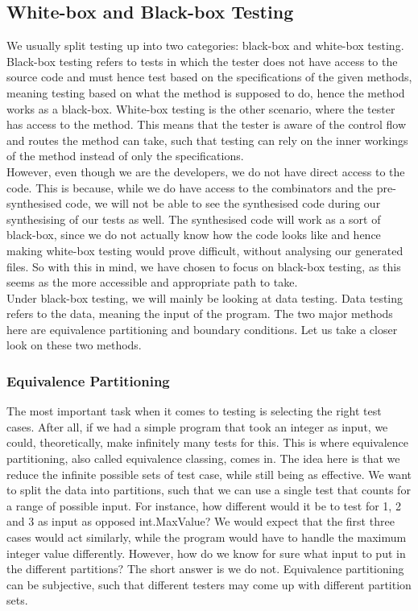\subsection{White-box and Black-box Testing}
We usually split testing up into two categories: black-box and white-box testing. Black-box testing refers to tests in which the tester does not have access to the source code and must hence test based on the specifications of the given methods, meaning testing based on what the method is supposed to do, hence the method works as a black-box. White-box testing is the other scenario, where the tester has access to the method. This means that the tester is aware of the control flow and routes the method can take, such that testing can rely on the inner workings of the method instead of only the specifications\cite{TestingCodeComplete}. \\
However, even though we are the developers, we do not have direct access to the code. This is because, while we do have access to the combinators and the pre-synthesised code, we will not be able to see the synthesised code during our synthesising of our tests as well. The synthesised code will work as a sort of black-box, since we do not actually know how the code looks like and hence making white-box testing would prove difficult, without analysing our generated files. So with this in mind, we have chosen to focus on black-box testing, as this seems as the more accessible and appropriate path to take. \\
Under black-box testing, we will mainly be looking at data testing. Data testing refers to the data, meaning the input of the program\cite{TestingBlackbox}. The two major methods here are equivalence partitioning and boundary conditions. Let us take a closer look on these two methods. 
\subsubsection{Equivalence Partitioning}
The most important task when it comes to testing is selecting the right test cases\cite{TestingBlackbox}. After all, if we had a simple program that took an integer as input, we could, theoretically, make infinitely many tests for this. This is where equivalence partitioning, also called equivalence classing, comes in. The idea here is that we reduce the infinite possible sets of test case, while still being as effective. We want to split the data into partitions, such that we can use a single test that counts for a range of possible input. For instance, how different would it be to test for 1, 2 and 3 as input as opposed int.MaxValue? We would expect that the first three cases would act similarly, while the program would have to handle the maximum integer value differently. However, how do we know for sure what input to put in the different partitions? The short answer is we do not. Equivalence partitioning can be subjective, such that different testers may come up with different partition sets\cite{TestingBlackbox}.
